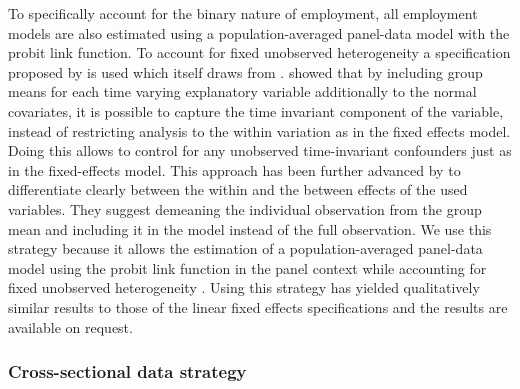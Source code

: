 To specifically account for the binary nature of employment, all employment
models are also estimated using a population-averaged panel-data
model with the probit link function. To account for fixed unobserved
heterogeneity a specification proposed by \citet{Bell2015} is used
which itself draws from \citet{Mundlak1978}. \citet{Mundlak1978}
showed that by including group means for each time varying explanatory
variable additionally to the normal covariates, it is possible to capture
the time invariant component of the variable, instead of restricting
analysis to the within variation as in the fixed effects model. Doing
this allows to control for any unobserved time-invariant confounders
just as in the fixed-effects model. This approach has been further
advanced by \citet{Bell2015} to differentiate clearly between the
within and the between effects of the used variables. They suggest
demeaning the individual observation from the group mean and including
it in the model instead of the full observation. We use this strategy
because it allows the estimation of a population-averaged panel-data
model using the probit link function in the panel context while accounting
for fixed unobserved heterogeneity \citep{Dieleman2014}. Using this
strategy has yielded qualitatively similar results to those of the
linear fixed effects specifications and the results are available
on request.


\subsubsection{Cross-sectional data strategy}


